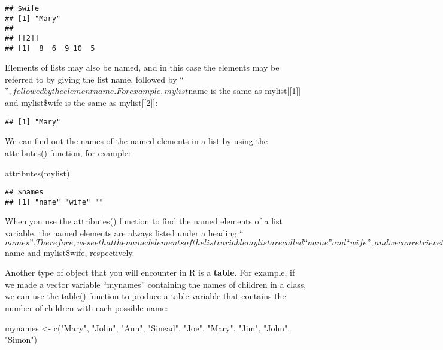 \documentclass[
]{book}
\newenvironment{Shaded}{\begin{snugshade}}{\end{snugshade}}
\newcommand{\FunctionTok}[1]{\textcolor[rgb]{0.00,0.00,0.00}{#1}}
\newcommand{\NormalTok}[1]{#1}
\newcommand{\OtherTok}[1]{\textcolor[rgb]{0.56,0.35,0.01}{#1}}
\newcommand{\SpecialCharTok}[1]{\textcolor[rgb]{0.00,0.00,0.00}{#1}}
\newcommand{\StringTok}[1]{\textcolor[rgb]{0.31,0.60,0.02}{#1}}
\begin{document}
\begin{verbatim}
## $wife
## [1] "Mary"
## 
## [[2]]
## [1]  8  6  9 10  5
\end{verbatim}

Elements of lists may also be named, and in this case the elements may be referred to by giving the list name, followed by ``\(”, followed by the element name. For example, mylist\)name is the same as mylist{[}{[}1{]}{]} and mylist\$wife is the same as mylist{[}{[}2{]}{]}:

\begin{Shaded}
\end{Shaded}

\begin{verbatim}
## [1] "Mary"
\end{verbatim}

We can find out the names of the named elements in a list by using the attributes() function, for example:

\begin{Shaded}
\begin{Highlighting}[]
\FunctionTok{attributes}\NormalTok{(mylist)}
\end{Highlighting}
\end{Shaded}

\begin{verbatim}
## $names
## [1] "name" "wife" ""
\end{verbatim}

When you use the attributes() function to find the named elements of a list variable, the named elements are always listed under a heading ``\(names”. Therefore, we see that the named elements of the list variable mylist are called “name” and “wife”, and we can retrieve their values by typing mylist\)name and mylist\$wife, respectively.

Another type of object that you will encounter in R is a \textbf{table}. For example, if we made a vector variable ``mynames'' containing the names of children in a class, we can use the table() function to produce a table variable that contains the number of children with each possible name:

\begin{Shaded}
\begin{Highlighting}[]
\NormalTok{mynames }\OtherTok{\textless{}{-}} \FunctionTok{c}\NormalTok{(}\StringTok{"Mary"}\NormalTok{, }\StringTok{"John"}\NormalTok{, }\StringTok{"Ann"}\NormalTok{, }\StringTok{"Sinead"}\NormalTok{, }\StringTok{"Joe"}\NormalTok{, }\StringTok{"Mary"}\NormalTok{, }\StringTok{"Jim"}\NormalTok{, }\StringTok{"John"}\NormalTok{, }\StringTok{"Simon"}\NormalTok{)}
\end{Highlighting}
\end{Shaded}
\end{document}
